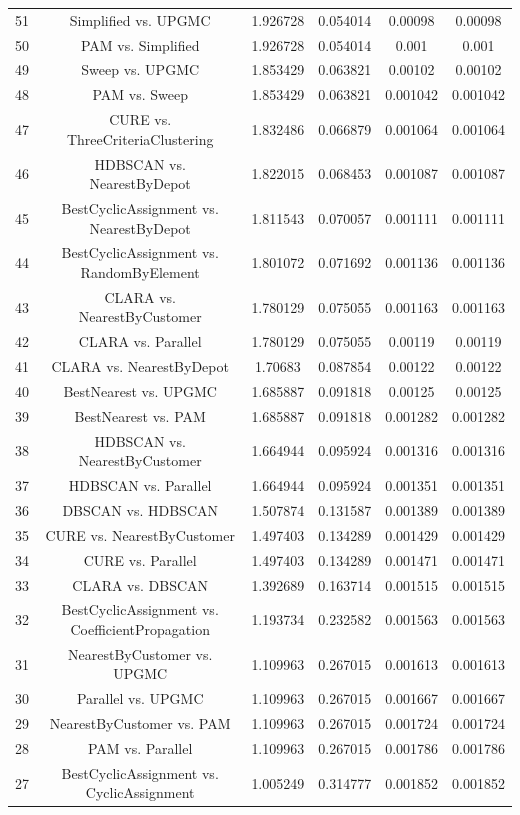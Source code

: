 \documentclass[a4paper,10pt]{article}
\begin{document}
\begin{landscape}
\begin{table}[!htp]
\begin{tabular}{cccccc}
51&Simplified vs. UPGMC&1.926728&0.054014&0.00098&0.00098\\
50&PAM vs. Simplified&1.926728&0.054014&0.001&0.001\\
49&Sweep vs. UPGMC&1.853429&0.063821&0.00102&0.00102\\
48&PAM vs. Sweep&1.853429&0.063821&0.001042&0.001042\\
47&CURE vs. ThreeCriteriaClustering&1.832486&0.066879&0.001064&0.001064\\
46&HDBSCAN vs. NearestByDepot&1.822015&0.068453&0.001087&0.001087\\
45&BestCyclicAssignment vs. NearestByDepot&1.811543&0.070057&0.001111&0.001111\\
44&BestCyclicAssignment vs. RandomByElement&1.801072&0.071692&0.001136&0.001136\\
43&CLARA vs. NearestByCustomer&1.780129&0.075055&0.001163&0.001163\\
42&CLARA vs. Parallel&1.780129&0.075055&0.00119&0.00119\\
41&CLARA vs. NearestByDepot&1.70683&0.087854&0.00122&0.00122\\
40&BestNearest vs. UPGMC&1.685887&0.091818&0.00125&0.00125\\
39&BestNearest vs. PAM&1.685887&0.091818&0.001282&0.001282\\
38&HDBSCAN vs. NearestByCustomer&1.664944&0.095924&0.001316&0.001316\\
37&HDBSCAN vs. Parallel&1.664944&0.095924&0.001351&0.001351\\
36&DBSCAN vs. HDBSCAN&1.507874&0.131587&0.001389&0.001389\\
35&CURE vs. NearestByCustomer&1.497403&0.134289&0.001429&0.001429\\
34&CURE vs. Parallel&1.497403&0.134289&0.001471&0.001471\\
33&CLARA vs. DBSCAN&1.392689&0.163714&0.001515&0.001515\\
32&BestCyclicAssignment vs. CoefficientPropagation&1.193734&0.232582&0.001563&0.001563\\
31&NearestByCustomer vs. UPGMC&1.109963&0.267015&0.001613&0.001613\\
30&Parallel vs. UPGMC&1.109963&0.267015&0.001667&0.001667\\
29&NearestByCustomer vs. PAM&1.109963&0.267015&0.001724&0.001724\\
28&PAM vs. Parallel&1.109963&0.267015&0.001786&0.001786\\
27&BestCyclicAssignment vs. CyclicAssignment&1.005249&0.314777&0.001852&0.001852\\

\end{tabular}
\end{table}
\end{landscape}
\end{document}
